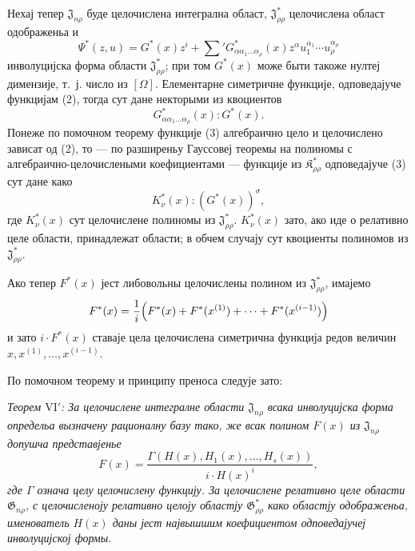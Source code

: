 ﻿\documentclass[11pt]{article}
\providecommand{\Kfield}{\mathfrak{K}}
\providecommand{\Jdom}{\mathfrak{J}}
\providecommand{\Gdom}{\mathfrak{G}}
\begin{document}
Нехај тепер $\Jdom_{n\rho}$ буде целочислена интегрална област, $\Jdom^*_{\rho\rho}$ целочислена област одображеньа и
\[
  \Psi^*(z,u)=G^*(x)z^i+
  \sum{}'G^*_{\alpha\alpha_1\ldots\alpha_\rho}(x)
  z^\alpha u_1^{\alpha_1}\cdots u_\rho^{\alpha_\rho}
\]
инволуцијска форма области $\Jdom^*_{\rho\rho}$; при том $G^*(x)$ може быти такоже нултеј димензије, т.~ј. число из $[\Omega]$. Елементарне симетричне функције, одповедајуче функцијам (2), тогда сут дане некторыми из квоциентов
\begin{equation}
  G^*_{\alpha\alpha_1\ldots\alpha_\rho}(x):G^*(x).
\tag{4}
\end{equation}
Понеже по помочном теорему функције (3) алгебраично цело и целочислено зависат од (2), то --- по разширеньу Гауссовеј теоремы на полиномы с алгебраично-целочислеными коефициентами --- функције из $\Kfield^*_{\rho\rho}$ одповедајуче (3) сут дане како
\begin{equation}
  K_\nu^*(x):(G^*(x))^\sigma,
\tag{5}
\end{equation}
где $K_\nu^*(x)$ сут целочислене полиномы из $\Jdom^*_{\rho\rho}$. $K_\nu^*(x)$ зато, ако иде о релативно целе области, принадлежат области; в обчем случају сут квоциенты полиномов из $\Jdom^*_{\rho\rho}$.

Ако тепер $F^*(x)$ јест либовольны целочислены полином из $\Jdom^*_{\rho\rho}$, имајемо
\[
  F^*(x)=\frac1i\Bigl(F^*(x)+F^*(x^{(1)})+\cdots+F^*(x^{(i-1)})\Bigr)
\]
и зато $i\cdot F^*(x)$ ставаје цела целочислена симетрична функција редов величин $x,x^{(1)},\ldots,x^{(i-1)}$.

По помочном теорему и принципу преноса следује зато:

{\itshape Теорем $\mathrm{VI}'$: За целочислене интегралне области $\Jdom_{n\rho}$ всака инволуцијска форма определьа вызначену рационалну базу тако, же всак полином $F(x)$ из $\Jdom_{n\rho}$ допушча представјенье}
\[
  F(x)=\frac{\Gamma(H(x),H_1(x),\ldots,H_s(x))}{i\cdot H(x)^i},
\]
{\itshape где $\Gamma$ означа целу целочислену функцију. За целочислене релативно целе области $\Gdom_{n\rho}$, с целочисленоју релативно целоју областју $\Gdom^*_{\rho\rho}$ како областју одображеньа, именователь $H(x)$ даны јест највышшим коефициентом одповедајучеј инволуцијској формы.}
\end{document}
